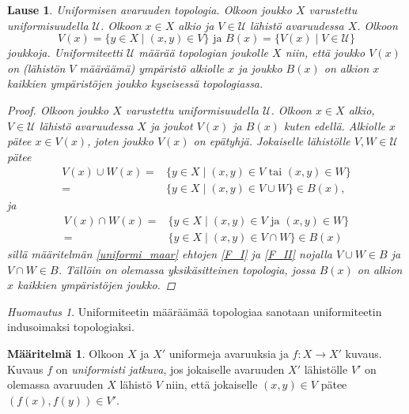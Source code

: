 \documentclass[12pt,a4paper,leqno]{report}
\newcommand{\U}{\mathcal{U}}
\theoremstyle{plain}
\newtheorem{lause}[equation]{Lause}
\theoremstyle{definition}
\newtheorem{maar}[equation]{Määritelmä}
\theoremstyle{remark}
\newtheorem{huom}[equation]{Huomautus}
\begin{document}
\begin{lause}
Uniformisen avaruuden topologia.
Olkoon joukko $X$ varustettu uniformisuudella $\U$.
Olkoon $x\in X$ alkio ja $V\in\U$ lähistö avaruudessa $X$. Olkoon %
\begin{equation*}V(x)=\{ y\in X\mid (x,y)\in V \}
\text{ ja }
B(x)=\{ V(x)\mid V\in\U \}
\end{equation*}
joukkoja.
Uniformiteetti $\U$ määrää topologian joukolle $X$ niin, että joukko $V(x)$ on (lähistön $V$ määräämä) ympäristö alkiolle $x$ ja joukko $B(x)$ on alkion $x$ kaikkien ympäristöjen joukko kyseisessä topologiassa.
\begin{proof}
Olkoon joukko $X$ varustettu uniformisuudella $\U$.
Olkoon $x\in X$ alkio, $V\in\U$ lähistö avaruudessa $X$ ja joukot $V(x)$ ja $B(x)$ kuten edellä. 
%
Alkiolle $x$ pätee $x\in V(x)$, joten joukko $V(x)$ on epätyhjä. 
Jokaiselle lähistölle $V,W\in\U$ pätee 
\begin{align*}
V(x)\cup W(x) =&\{ y\in X\mid (x,y)\in V \text{ tai } (x,y)\in W \}\\
=&\{ y\in X\mid (x,y)\in V\cup W \}
\in B(x),
\end{align*} 
ja 
\begin{align*}
V(x)\cap W(x) =&\{ y\in X\mid (x,y)\in V \text{ ja } (x,y)\in W \}\\
=&\{ y\in X\mid (x,y)\in V\cap W \}
\in B(x)
\end{align*} 
sillä määritelmän \ref{uniformi_maar} ehtojen \ref{F_I} ja \ref{F_II} nojalla $ V\cup W \in B$ ja $ V\cap W \in B$. Tällöin on olemassa yksikäsitteinen topologia, jossa $B(x)$ on alkion $x$ kaikkien ympäristöjen joukko.\cite{Eom1}
\end{proof}
\end{lause}
\begin{huom}
Uniformiteetin määräämää topologiaa sanotaan uniformiteetin indusoimaksi topologiaksi.
\end{huom}
\begin{maar}\label{uniformisti_jatkuva}
Olkoon $X$ ja $X'$ uniformeja avaruuksia 
ja $f\colon X\rightarrow X'$ kuvaus.
Kuvaus $f$ on \emph{uniformisti jatkuva}, jos jokaiselle avaruuden $X'$ lähistölle $V'$ on olemassa avaruuden $X$ lähistö $V$ niin, että jokaiselle $(x,y)\in V$ pätee $(f(x),f(y))\in V'$. 
\end{maar}
\end{document}
